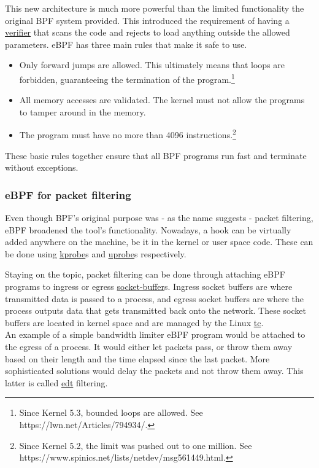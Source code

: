 This new architecture is much more powerful than the limited functionality the original BPF system provided. This introduced the requirement of having a \underline{\gls{verifier}} that scans the code and rejects to load anything outside the allowed parameters. eBPF has three main rules that make it safe to use.
\begin{itemize}
	\item Only forward jumps are allowed. This ultimately means that loops are forbidden, guaranteeing the termination of the program.\footnote{Since Kernel 5.3, bounded loops are allowed. See https://lwn.net/Articles/794934/.}
	\item All memory accesses are validated. The kernel must not allow the programs to tamper around in the memory.
	\item The program must have no more than 4096 instructions.\footnote{Since Kernel 5.2, the limit was pushed out to one million. See https://www.spinics.net/lists/netdev/msg561449.html.}
\end{itemize}

These basic rules together ensure that all BPF programs run fast and terminate without exceptions.


\subsubsection{eBPF for packet filtering}
Even though BPF's original purpose was - as the name suggests - packet filtering, eBPF broadened the tool's functionality. Nowadays, a hook can be virtually added anywhere on the machine, be it in the kernel or user space code. These can be done using \underline{\gls{kprobe}}s and \underline{\gls{uprobe}}s respectively.

Staying on the topic, packet filtering can be done through attaching eBPF programs to ingress or egress \underline{\gls{socket-buffer}}s. Ingress socket buffers are where transmitted data is passed to a process, and egress socket buffers are where the process outputs data that gets transmitted back onto the network. These socket buffers are located in kernel space and are managed by the Linux \underline{\gls{tc}}. \\

An example of a simple bandwidth limiter eBPF program would be attached to the egress of a process. It would either let packets pass, or throw them away based on their length and the time elapsed since the last packet. More sophisticated solutions would delay the packets and not throw them away. This latter is called \underline{\gls{edt}} filtering.

